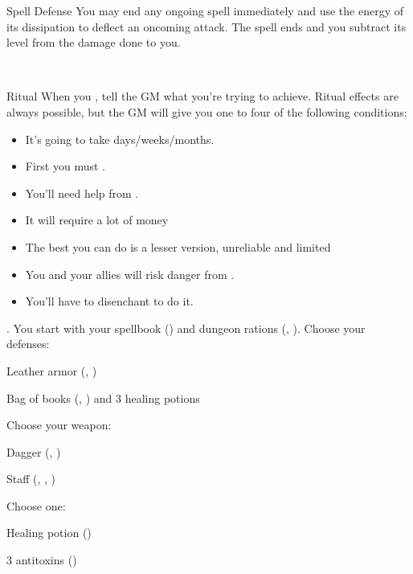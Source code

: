 \documentclass[8pt]{extarticle}
\begin{document}
\begin{minipage}[t]{4.6in}
\begin{basicmove}{Spell Defense}
  You may end any ongoing spell immediately and use the energy of its
  dissipation to deflect an oncoming attack. The spell ends and you
  subtract its level from the damage done to you.
\end{basicmove}
\

\begin{basicmove}{Ritual}
  When you , tell the GM what you’re trying to achieve. Ritual effects
  are always possible, but the GM will give you one to four of the
  following conditions:

  \begin{itemize}
  \item It’s going to take days/weeks/months.
  \item First you must                       .
  \item You’ll need help from                       .
  \item It will require a lot of money
  \item The best you can do is a lesser version, unreliable and limited
  \item You and your allies will risk danger from                       .
  \item You’ll have to disenchant \blank to do it.
  \end{itemize}
\end{basicmove}


\vfill\null
\end{minipage}
\charlower

\clearpage

\gearbanner

\begin{multicols}{2}

  . You start with your spellbook () and dungeon
  rations (, ). Choose your defenses:

  \begin{choices}
  \item Leather armor (, )
  \item Bag of books (, ) and 3 healing potions
  \end{choices}

  Choose your weapon:

  \begin{choices}
  \item Dagger (, )
  \item Staff (, , )
  \end{choices}

  Choose one:

  \begin{choices}
  \item Healing potion ()
  \item 3 antitoxins ()
  \end{choices}

\columnbreak

\

\end{multicols}
\end{document}
